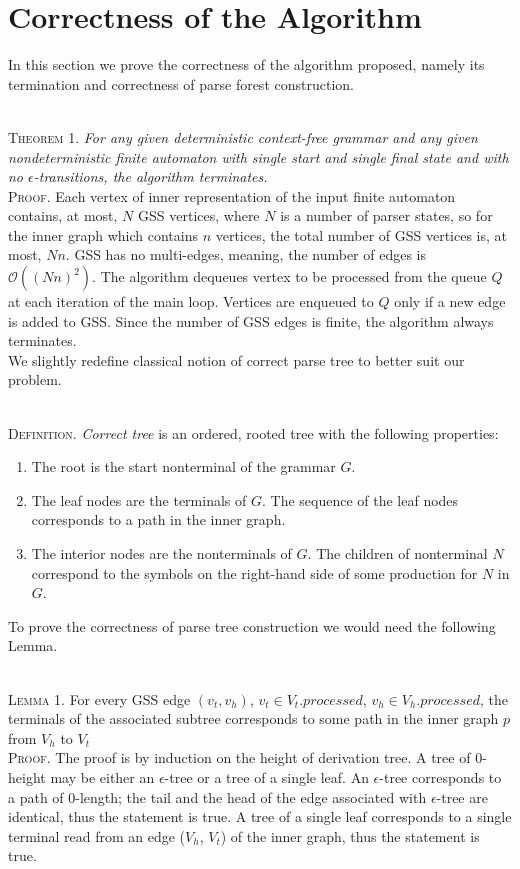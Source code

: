 \section{Correctness of the Algorithm}
In this section we prove the correctness of the algorithm proposed, namely its termination 
and correctness of parse forest construction.

~\\
\textsc{Theorem 1.}
\textit{For any given deterministic context-free grammar and any given nondeterministic
finite automaton with single start and single final state and with no $\epsilon$-transitions,
the algorithm terminates.}
~\\
\textsc{Proof.}
Each vertex of inner representation of the input finite automaton contains, at most, 
$N$ GSS vertices, where $N$ is a number of parser states, so for the inner graph which contains $n$
vertices, the total number of GSS vertices is, at most, $Nn$. GSS has no multi-edges,  
meaning, the number of edges is $\mathcal{O}((Nn)^2)$. 
The algorithm dequeues vertex to be processed from the queue $Q$ at each iteration of the 
main loop. Vertices are enqueued to $Q$ only if a new edge is added to GSS. Since the number of 
GSS edges is finite, the algorithm always terminates. 
~\\

We slightly redefine classical notion of correct parse tree to better suit our problem.

~\\
\textsc{Definition.} 
\emph{Correct tree} is an ordered, rooted tree with the following properties:
\begin{enumerate}
  \item The root is the start nonterminal of the grammar $G$.
  \item The leaf nodes are the terminals of $G$. The sequence of the leaf nodes 
        corresponds to a path in the inner graph. 
  \item The interior nodes are the nonterminals of $G$. The children of nonterminal 
        $N$ correspond to the symbols on the right-hand side of some production for $N$ in $G$.
\end{enumerate}

To prove the correctness of parse tree construction we would need the following Lemma.

~\\
\textsc{Lemma 1.}
For every GSS edge $(v_{t}, v_{h})$, $v_{t} \in V_{t}.processed$, $v_{h} \in V_{h}.processed$, 
the terminals of the associated subtree corresponds to some path in the inner graph $p$ from $V_{h}$ to $V_{t}$
~\\
\textsc{Proof.}
The proof is by induction on the height of derivation tree. 
A tree of 0-height may be either an $\epsilon$-tree or a tree of a single leaf.
An $\epsilon$-tree corresponds to a path of 0-length; the tail and the head of the edge associated with 
$\epsilon$-tree are identical, thus the statement is true. A tree of a single leaf corresponds to a single 
terminal read from an edge ($V_{h}$, $V_{t}$) of the inner graph, thus the statement is true.

